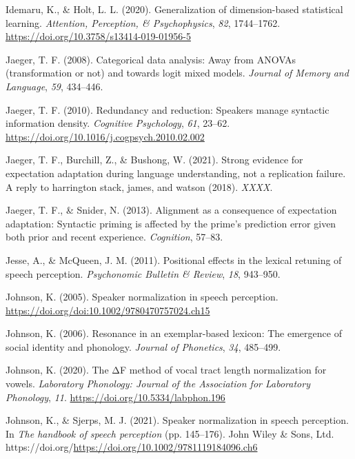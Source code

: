 \documentclass[
  11pt,
  english,
  man,floatsintext]{apa6}
\newlength{\cslhangindent}
\newlength{\cslentryspacingunit} %
\newenvironment{CSLReferences}[2] %
 {%
  \setlength{\parindent}{0pt}
  \ifodd #1
  \let\oldpar\par
  \def\par{\hangindent=\cslhangindent\oldpar}
  \fi
  \setlength{\parskip}{#2\cslentryspacingunit}
 }%
 {}
\begin{document}
\begin{CSLReferences}{1}{0}
\leavevmode{}%
Idemaru, K., \& Holt, L. L. (2020). Generalization of dimension-based statistical learning. \emph{Attention, Perception, \& Psychophysics}, \emph{82}, 1744--1762. \url{https://doi.org/10.3758/s13414-019-01956-5}

\leavevmode{}%
Jaeger, T. F. (2008). Categorical data analysis: Away from ANOVAs (transformation or not) and towards logit mixed models. \emph{Journal of Memory and Language}, \emph{59}, 434--446.

\leavevmode{}%
Jaeger, T. F. (2010). Redundancy and reduction: Speakers manage syntactic information density. \emph{Cognitive Psychology}, \emph{61}, 23--62. \url{https://doi.org/10.1016/j.cogpsych.2010.02.002}

\leavevmode{}%
Jaeger, T. F., Burchill, Z., \& Bushong, W. (2021). Strong evidence for expectation adaptation during language understanding, not a replication failure. A reply to harrington stack, james, and watson (2018). \emph{XXXX}.

\leavevmode{}%
Jaeger, T. F., \& Snider, N. (2013). Alignment as a consequence of expectation adaptation: Syntactic priming is affected by the prime's prediction error given both prior and recent experience. \emph{Cognition}, 57--83.

\leavevmode{}%
Jesse, A., \& McQueen, J. M. (2011). Positional effects in the lexical retuning of speech perception. \emph{Psychonomic Bulletin \& Review}, \emph{18}, 943--950.

\leavevmode{}%
Johnson, K. (2005). Speaker normalization in speech perception. \url{https://doi.org/doi:10.1002/9780470757024.ch15}

\leavevmode{}%
Johnson, K. (2006). Resonance in an exemplar-based lexicon: The emergence of social identity and phonology. \emph{Journal of Phonetics}, \emph{34}, 485--499.

\leavevmode{}%
Johnson, K. (2020). The ΔF method of vocal tract length normalization for vowels. \emph{Laboratory Phonology: Journal of the Association for Laboratory Phonology}, \emph{11}. \url{https://doi.org/10.5334/labphon.196}

\leavevmode{}%
Johnson, K., \& Sjerps, M. J. (2021). Speaker normalization in speech perception. In \emph{The handbook of speech perception} (pp. 145--176). John Wiley \& Sons, Ltd. https://doi.org/\url{https://doi.org/10.1002/9781119184096.ch6}


\end{CSLReferences}
\end{document}
